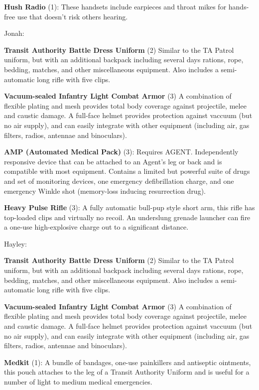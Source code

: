 \textbf{Hush Radio} (1): These handsets include earpieces and throat mikes for hands-free use that doesn't risk others hearing.



Jonah:

\textbf{Transit Authority Battle Dress Uniform} (2) Similar to the TA Patrol uniform, but with an additional backpack including several days rations, rope, bedding, matches, and other miscellaneous equipment. Also includes a semi-automatic long rifle with five clips.

\textbf{Vacuum-sealed Infantry Light Combat Armor} (3) A combination of flexible plating and mesh provides total body coverage against projectile, melee and caustic damage. A full-face helmet provides protection against vaccuum (but no air supply), and can easily integrate with other equipment (including air, gas filters, radios, antennae and binoculars).

\textbf{AMP (Automated Medical Pack)} (3): Requires AGENT. Independently responsive device that can be attached to an Agent's leg or back and is compatible with most equipment. Contains a limited but powerful suite of drugs and set of monitoring devices, one emergency defibrillation charge, and one emergency Winkle shot (memory-loss inducing resurrection drug).

\textbf{Heavy Pulse Rifle }(3): A fully automatic bull-pup style short arm, this rifle has top-loaded clips and virtually no recoil. An underslung grenade launcher can fire a one-use high-explosive charge out to a significant distance.



Hayley:

\textbf{Transit Authority Battle Dress Uniform} (2) Similar to the TA Patrol uniform, but with an additional backpack including several days rations, rope, bedding, matches, and other miscellaneous equipment. Also includes a semi-automatic long rifle with five clips.

\textbf{Vacuum-sealed Infantry Light Combat Armor} (3) A combination of flexible plating and mesh provides total body coverage against projectile, melee and caustic damage. A full-face helmet provides protection against vaccuum (but no air supply), and can easily integrate with other equipment (including air, gas filters, radios, antennae and binoculars).

\textbf{Medkit} (1): A bundle of bandages, one-use painkillers and antiseptic ointments, this pouch attaches to the leg of a Transit Authority Uniform and is useful for a number of light to medium medical emergencies.

